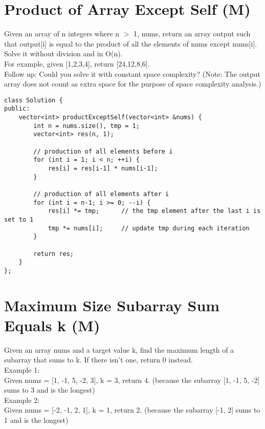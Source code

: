 \section{Product of Array Except Self (M)}
Given an array of n integers where n $>$ 1, nums, return an array output such that output[i] is equal to the product of all the elements of nums except nums[i]. Solve it without division and in O(n). \\

For example, given [1,2,3,4], return [24,12,8,6].\\

Follow up: Could you solve it with constant space complexity? (Note: The output array does not count as extra space for the purpose of space complexity analysis.)\\

\begin{lstlisting}
class Solution {
public:
    vector<int> productExceptSelf(vector<int> &nums) {
        int n = nums.size(), tmp = 1;
        vector<int> res(n, 1);
        
        // production of all elements before i
        for (int i = 1; i < n; ++i) {
            res[i] = res[i-1] * nums[i-1];
        }
        
        // production of all elements after i
        for (int i = n-1; i >= 0; --i) {
            res[i] *= tmp;      // the tmp element after the last i is set to 1
            tmp *= nums[i];     // update tmp during each iteration
        }
        
        return res;
    }
};
\end{lstlisting}


\section{Maximum Size Subarray Sum Equals k (M)}
Given an array nums and a target value k, find the maximum length of a subarray that sums to k. If there isn't one, return 0 instead.\\

Example 1:\\
Given nums = [1, -1, 5, -2, 3], k = 3, return 4. (because the subarray [1, -1, 5, -2] sums to 3 and is the longest)\\

Example 2: \\
Given nums = [-2, -1, 2, 1], k = 1, return 2. (because the subarray [-1, 2] sums to 1 and is the longest) \\

